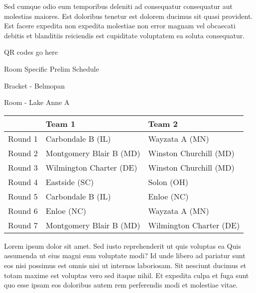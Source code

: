 \documentclass{article}%
\begin{document}
\newline%
Sed cumque odio eum temporibus deleniti ad consequatur consequatur aut molestias maiores. Est doloribus tenetur est dolorem ducimus sit quasi provident. Est facere expedita non expedita molestiae non error magnam vel obcaecati debitis et blanditiis reiciendis est cupiditate voluptatem ea soluta consequatur.%
\vspace*{140pt}%
\begin{center}%
\begin{Huge}%
QR codes go here%
\end{Huge}%
\end{center}%
\newpage%
\begin{center}%
\begin{Huge}%
Room Specific Prelim Schedule%
\end{Huge}%
\vspace*{8pt}%
\linebreak%
\begin{Large}%
Bracket {-} Belmopan%
\end{Large}%
\vspace*{8pt}%
\linebreak%
\vspace*{8pt}%
\begin{Large}%
Room {-} Lake Anne A%
\end{Large}%
\end{center}%
%
\begin{tabularx}{\textwidth}{|c|Y|Y|}%
\hline%
&Team 1&Team 2\\%
\hline%
Round 1&Carbondale B (IL)&Wayzata A (MN)\\%
Round 2&Montgomery Blair B (MD)&Winston Churchill (MD)\\%
Round 3&Wilmington Charter (DE)&Winston Churchill (MD)\\%
Round 4&Eastside (SC)&Solon (OH)\\%
Round 5&Carbondale B (IL)&Enloe (NC)\\%
Round 6&Enloe (NC)&Wayzata A (MN)\\%
Round 7&Montgomery Blair B (MD)&Wilmington Charter (DE)\\%
\hline%
\end{tabularx}%
\vspace*{8pt}%
\newline%
Lorem ipsum dolor sit amet. Sed iusto reprehenderit ut quis voluptas ea Quis assumenda ut eius magni eum voluptate modi? Id unde libero ad pariatur sunt eos nisi possimus est omnis nisi ut internos laboriosam. Sit nesciunt ducimus et totam maxime est voluptas vero sed itaque nihil. Et expedita culpa et fuga sunt quo esse ipsam eos doloribus autem rem perferendis modi et molestiae vitae.\newline%
\end{document}
